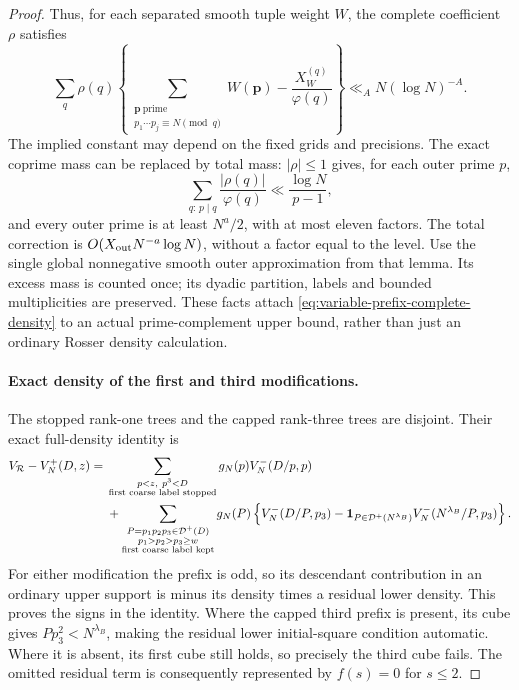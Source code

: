 \documentclass[11pt]{article}
\begin{document}
\begin{proof}
Thus, for each separated smooth tuple weight $W$, the complete
coefficient $\rho$ satisfies
\[
 \sum_q\rho(q)\left\{
   \sum_{\substack{\boldsymbol p\ \mathrm{prime}\\
                p_1\cdots p_j\equiv N\pmod q}}W(\boldsymbol p)
       -\frac{X_W^{(q)}}{\varphi(q)}\right\}
       \ll_A N(\log N)^{-A}.
\]
The implied constant may depend on the fixed grids and precisions.
The exact coprime mass can be replaced by total mass: $|\rho|\le1$
gives, for each outer prime $p$,
\[
 \sum_{q:\,p\mid q}\frac{|\rho(q)|}{\varphi(q)}
       \ll\frac{\log N}{p-1},
\]
and every outer prime is at least $N^a/2$, with at most eleven
factors. The total correction is
$O(X_{\rm out}N^{-a}\log N)$, without a factor equal to the level.
Use the single global nonnegative smooth outer approximation from
that lemma. Its excess mass is counted once; its dyadic partition,
labels and bounded multiplicities are preserved.
These facts attach \eqref{eq:variable-prefix-complete-density} to
an actual prime-complement upper bound, rather than just an ordinary
Rosser density calculation.

\paragraph{Exact density of the first and third modifications.}
The stopped rank-one trees and the capped rank-three trees are
disjoint. Their exact full-density identity is
\begin{align}
 V_{\mathcal R}-V_N^+(D,z)
 ={}&\sum_{\substack{p<z,\ p^3<D\\
                       \text{first coarse label stopped}}}
          g_N(p)V_N^-(D/p,p)\notag\\
 &+\sum_{\substack{P=p_1p_2p_3\in\mathcal D^+(D)\\
                   p_1>p_2>p_3\ge w\\
                   \text{first coarse label kept}}}
 g_N(P)\left\{V_N^-(D/P,p_3)
 -\mathbf1_{P\in\mathcal D^+(N^{\lambda_B})}
                     V_N^-(N^{\lambda_B}/P,p_3)\right\}.
 \label{eq:variable-prefix-upper-exact-density}
\end{align}
For either modification the prefix is odd, so its descendant
contribution in an ordinary upper support is minus its density
times a residual lower density. This proves the signs in the
identity. Where the capped third prefix is present, its cube gives
$Pp_3^2<N^{\lambda_B}$, making the residual lower initial-square
condition automatic. Where it is absent, its first cube still
holds, so precisely the third cube fails. The omitted residual
term is consequently represented by $f(s)=0$ for $s\le2$.


\end{proof}
\end{document}

